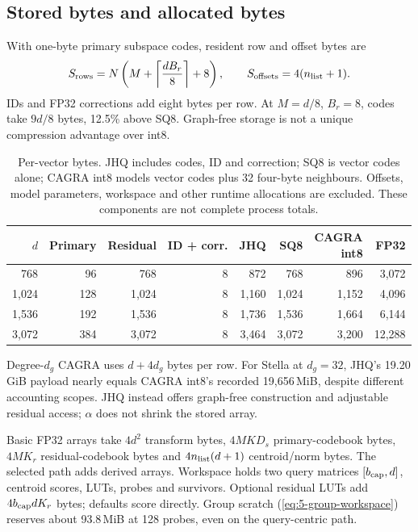 \subsection{Stored bytes and allocated bytes}

With one-byte primary subspace codes, resident row and offset bytes are
\begin{equation}
 S_{\rm rows}=N\left(M+\left\lceil\frac{dB_r}{8}\right\rceil+8\right),
 \qquad S_{\rm offsets}=4(n_{\rm list}+1).
 \label{eq:4-row-storage}
\end{equation}
IDs and FP32 corrections add eight bytes per row. At $M=d/8$, $B_r=8$, codes take $9d/8$ bytes, 12.5\% above SQ8. Graph-free storage is not a unique compression advantage over int8.

\begin{table}[tbp]
\centering
\caption[Per-vector storage model]{Per-vector bytes. JHQ includes codes, ID and correction; SQ8 is
vector codes alone; CAGRA int8 models vector codes plus 32 four-byte
neighbours. Offsets, model parameters, workspace and other runtime
allocations are excluded. These components are not complete process totals.}
\label{tab:4-bytes}
\footnotesize\setlength{\tabcolsep}{4pt}
\begin{tabular}{@{}rrrrrrrr@{}}
\toprule
$d$ & Primary & Residual & ID + corr. & JHQ & SQ8 & \shortstack{CAGRA\\int8} & FP32 \\
\midrule
768 & 96 & 768 & 8 & 872 & 768 & 896 & 3,072 \\
1,024 & 128 & 1,024 & 8 & 1,160 & 1,024 & 1,152 & 4,096 \\
1,536 & 192 & 1,536 & 8 & 1,736 & 1,536 & 1,664 & 6,144 \\
3,072 & 384 & 3,072 & 8 & 3,464 & 3,072 & 3,200 & 12,288 \\
\bottomrule
\end{tabular}
\end{table}

Degree-$d_g$ CAGRA uses $d+4d_g$ bytes per row. For Stella at $d_g=32$, JHQ's 19.20\,GiB payload nearly equals CAGRA int8's recorded 19,656\,MiB, despite different accounting scopes. JHQ instead offers graph-free construction and adjustable residual access; $\alpha$ does not shrink the stored array.

Basic FP32 arrays take $4d^2$ transform bytes, $4MKD_s$ primary-codebook bytes, $4MK_r$ residual-codebook bytes and $4n_{\rm list}(d+1)$ centroid/norm bytes. The selected path adds derived arrays. Workspace holds two query matrices $[b_{\rm cap},d]$, centroid scores, LUTs, probes and survivors. Optional residual LUTs add $4b_{\rm cap}dK_r$ bytes; defaults score directly. Group scratch (\cref{eq:5-group-workspace}) reserves about 93.8\,MiB at 128 probes, even on the query-centric path.

